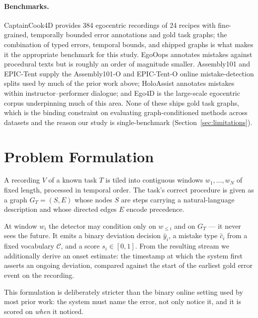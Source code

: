 \documentclass[10pt,twocolumn]{article}
\begin{document}
\paragraph{Benchmarks.}
CaptainCook4D \citep{peddi2024captaincook4d} provides 384 egocentric recordings
of 24 recipes with fine-grained, temporally bounded error annotations and gold
task graphs; the combination of typed errors, temporal bounds, and shipped
graphs is what makes it the appropriate benchmark for this study. EgoOops
\citep{haneji2025egooops} annotates mistakes against procedural texts but is
roughly an order of magnitude smaller. Assembly101
\citep{sener2022assembly101} and EPIC-Tent \citep{jang2019epictent} supply the
Assembly101-O and EPIC-Tent-O online mistake-detection splits used by much of
the prior work above; HoloAssist \citep{wang2023holoassist} annotates mistakes
within instructor--performer dialogue; and Ego4D
\citep{grauman2022ego4d} is the large-scale egocentric corpus underpinning much
of this area. None of these ships gold task graphs, which is the binding
constraint on evaluating graph-conditioned methods across datasets and the
reason our study is single-benchmark (Section~\ref{sec:limitations}).

\section{Problem Formulation}
\label{sec:problem}

A recording $V$ of a known task $T$ is tiled into contiguous windows
$w_1,\dots,w_N$ of fixed length, processed in temporal order. The task's correct
procedure is given as a graph $G_T=(S,E)$ whose nodes $S$ are steps carrying a
natural-language description and whose directed edges $E$ encode precedence.

At window $w_i$ the detector may condition only on $w_{\le i}$ and on $G_T$ --- it
never sees the future. It emits a binary deviation decision $\hat y_i$, a mistake
type $\hat c_i$ from a fixed vocabulary $\mathcal{C}$, and a score
$s_i\in[0,1]$. From the resulting stream we additionally derive an onset
estimate: the timestamp at which the system first asserts an ongoing deviation,
compared against the start of the earliest gold error event on the recording.

This formulation is deliberately stricter than the binary online setting used by
most prior work: the system must name the error, not only notice it, and it is
scored on \emph{when} it noticed.
\end{document}
